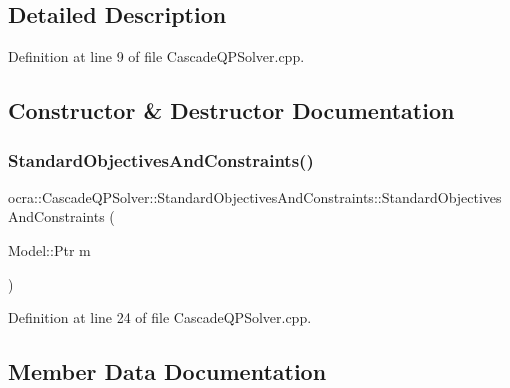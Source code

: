 \subsection{Detailed Description}


Definition at line 9 of file Cascade\+Q\+P\+Solver.\+cpp.



\subsection{Constructor \& Destructor Documentation}
\hypertarget{structocra_1_1CascadeQPSolver_1_1StandardObjectivesAndConstraints_afa2f8a2043316e306b16bb8edb26b6f4}{}\label{structocra_1_1CascadeQPSolver_1_1StandardObjectivesAndConstraints_afa2f8a2043316e306b16bb8edb26b6f4} 
\subsubsection{\texorpdfstring{Standard\+Objectives\+And\+Constraints()}{StandardObjectivesAndConstraints()}}
{\footnotesize\ttfamily ocra\+::\+Cascade\+Q\+P\+Solver\+::\+Standard\+Objectives\+And\+Constraints\+::\+Standard\+Objectives\+And\+Constraints (\begin{DoxyParamCaption}\item[{Model\+::\+Ptr}]{m }\end{DoxyParamCaption})\hspace{0.3cm}{\ttfamily [inline]}}



Definition at line 24 of file Cascade\+Q\+P\+Solver.\+cpp.



\subsection{Member Data Documentation}
\hypertarget{structocra_1_1CascadeQPSolver_1_1StandardObjectivesAndConstraints_a31b476355775f3c5ec5caf75722325b4}{}\label{structocra_1_1CascadeQPSolver_1_1StandardObjectivesAndConstraints_a31b476355775f3c5ec5caf75722325b4} 
